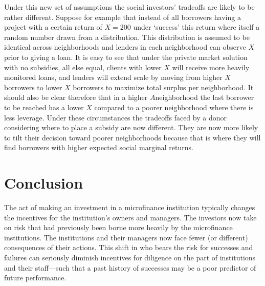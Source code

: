 \documentclass[letterpaper, 12pt]{article}
\begin{document}
Under this new set of assumptions the social investors' tradeoffs are
likely to be rather different. Suppose for example that instead of all
borrowers having a project with a certain return of \(X = 200\) under
`success' this return where itself a random number drawn from a
distribution. This distribution is assumed to be identical across
neighborhoods and lenders in each neighborhood can observe \(X\) prior
to giving a loan. It is easy to see that under the private market
solution with no subsidies, all else equal, clients with lower \(X\)
will receive more heavily monitored loans, and lenders will extend scale
by moving from higher \(X\) borrowers to lower \(X\) borrowers to
maximize total surplus per neighborhood. It should also be clear
therefore that in a higher \(A\)neighborhood the last borrower to be
reached has a lower \(X\) compared to a poorer neighborhood where there
is less leverage. Under these circumstances the tradeoffs faced by a
donor considering where to place a subsidy are now different. They are
now more likely to tilt their decision toward poorer neighborhoods
because that is where they will find borrowers with higher expected
social marginal returns.


\section{Conclusion}\label{conclusion}

The act of making an investment in a microfinance institution typically
changes the incentives for the institution's owners and managers. The
investors now take on risk that had previously been borne more heavily
by the microfinance institutions. The institutions and their managers
now face fewer (or different) consequences of their actions. This shift
in who bears the risk for successes and failures can seriously diminish
incentives for diligence on the part of institutions and their
staff---such that a past history of successes may be a poor predictor of
future performance.
\end{document}

